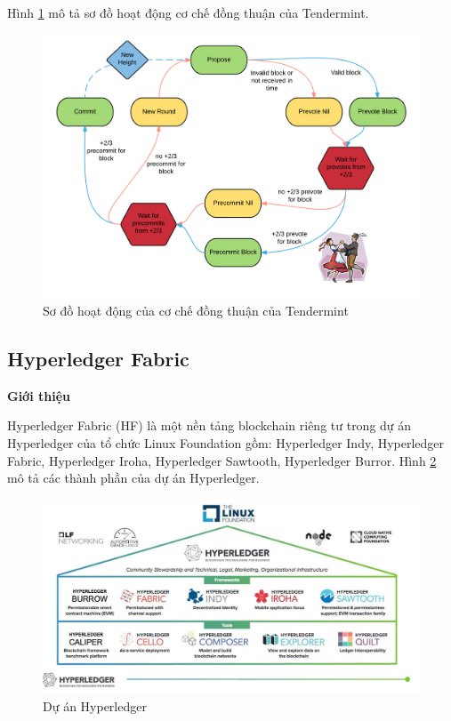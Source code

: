 Hình \ref{fig:bc_consensus} mô tả sơ đồ hoạt động cơ chế đồng thuận của Tendermint.
\begin{figure}[htbp]
\centering
\includegraphics[width=.9\linewidth]{img/bc_consensus.png}
\caption{Sơ đồ hoạt động của cơ chế đồng thuận của Tendermint}
\label{fig:bc_consensus}
\end{figure}

\subsection{Hyperledger Fabric}

\textbf{Giới thiệu}

Hyperledger Fabric (HF) là một nền tảng blockchain riêng tư trong dự án Hyperledger của tổ chức Linux Foundation gồm: Hyperledger Indy, Hyperledger Fabric, Hyperledger Iroha, Hyperledger Sawtooth, Hyperledger Burror.
Hình \ref{fig:hlf_um} mô tả các thành phần của dự án Hyperledger.

\begin{figure}[htbp]
\centering
\includegraphics[width=.9\linewidth]{img/hlf_um.jpg}
\caption{Dự án Hyperledger}
\label{fig:hlf_um}
\end{figure}

